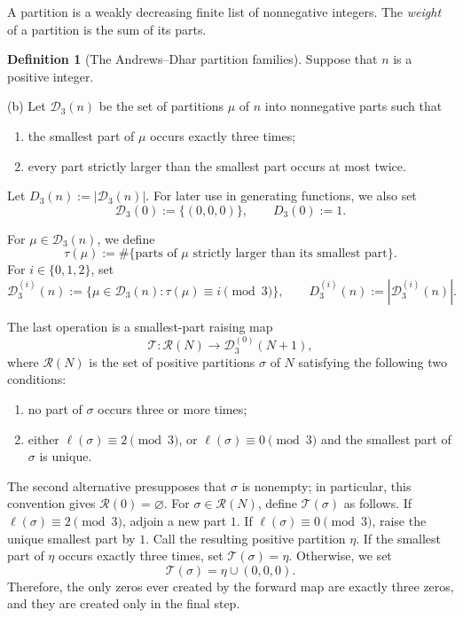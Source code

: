 \documentclass[11pt]{amsart}
\theoremstyle{definition}
\newtheorem*{definition}{Definition}
\theoremstyle{remark}
\newcommand{\D}{\mathcal D}
\newcommand{\R}{\mathcal R}
\begin{document}
A partition is a weakly decreasing finite list of nonnegative integers.  The \emph{weight} of a partition is the sum of its parts.

\begin{definition}[The Andrews--Dhar partition families]\label{def:families}
Suppose that $n$ is a positive integer.

\smallskip
\noindent
(b) Let $\D_3(n)$ be the set of partitions $\mu$ of $n$ into nonnegative parts such that
\begin{enumerate}[label=(\roman*)]
\item the smallest part of $\mu$ occurs exactly three times;
\item every part strictly larger than the smallest part occurs at most twice.
\end{enumerate}
Let $D_3(n):=|\D_3(n)|$.
For later use in generating functions, we also set
\[
        \D_3(0):=\{(0,0,0)\},\qquad D_3(0):=1.
\]
\end{definition}

For $\mu\in\D_3(n)$, we define
\[
   \tau(\mu):=\#\{\text{parts of }\mu\text{ strictly larger than its smallest part}\}.
\]
For $i\in\{0,1,2\}$, set
\[
   \D_3^{(i)}(n):=\{\mu\in\D_3(n):\tau(\mu)\equiv i\pmod3\},
   \qquad
   D_3^{(i)}(n):=|\D_3^{(i)}(n)|.
\]

The last operation is a smallest-part raising map
\[
        \mathcal T:\R(N)\longrightarrow \D_3^{(0)}(N+1),
\]
where $\R(N)$ is the set of positive partitions $\sigma$ of $N$ satisfying the following two conditions:
\begin{enumerate}[label=(\roman*),leftmargin=2.6em]
\item no part of $\sigma$ occurs three or more times;
\item either $\ell(\sigma)\equiv2\pmod3$, or $\ell(\sigma)\equiv0\pmod3$ and the smallest part of $\sigma$ is unique.
\end{enumerate}
The second alternative presupposes that $\sigma$ is nonempty; in particular, this convention gives $\R(0)=\varnothing$.
For $\sigma\in\R(N)$, define $\mathcal T(\sigma)$ as follows.  If $\ell(\sigma)\equiv2\pmod3$, adjoin a new part $1$.  If $\ell(\sigma)\equiv0\pmod3$, raise the unique smallest part by $1$.  Call the resulting positive partition $\eta$.  If the smallest part of $\eta$ occurs exactly three times, set $\mathcal T(\sigma)=\eta$.  Otherwise, we set
\[
        \mathcal T(\sigma)=\eta\cup(0,0,0).
\]
Therefore, the only zeros ever created by the forward map are exactly three zeros, and they are created only in the final step.
\end{document}
